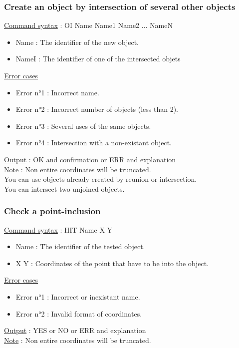 \documentclass[a4paper, 12pts]{article}
\begin{document}
		\subsubsection{Create an object by intersection of several other objects}
			\uline{Command syntax} :
			OI Name Name1 Name2 ... NameN
			\begin{itemize}
				\item Name : The identifier of the new object.
				\item NameI : The identifier of one of the intersected objets
			\end{itemize}
			\uline{Error cases}
			\begin{itemize}
				\item Error n°1 : Incorrect name.
				\item Error n°2 : Incorrect number of objects (less than 2).
				\item Error n°3 : Several uses of the same objects.
				\item Error n°4 : Intersection with a non-existant object.
			\end{itemize}
			\uline{Output} : OK and confirmation or ERR and explanation\\
			\uline{Note} : 
			Non entire coordinates will be truncated.\\
			You can use objects already created by reunion or intersection.\\
			You can intersect two unjoined objects.

		\subsubsection{Check a point-inclusion}
			\uline{Command syntax} :
			HIT Name X Y
			\begin{itemize}
				\item Name : The identifier of the tested object.
				\item X Y : Coordinates of the point that have to be into the object.
			\end{itemize}
			\uline{Error cases}
			\begin{itemize}
				\item Error n°1 : Incorrect or inexistant name.
				\item Error n°2 : Invalid format of coordinates.
			\end{itemize}
			\uline{Output} : YES or NO or ERR and explanation\\
			\uline{Note} : 
			Non entire coordinates will be truncated.
\end{document}
